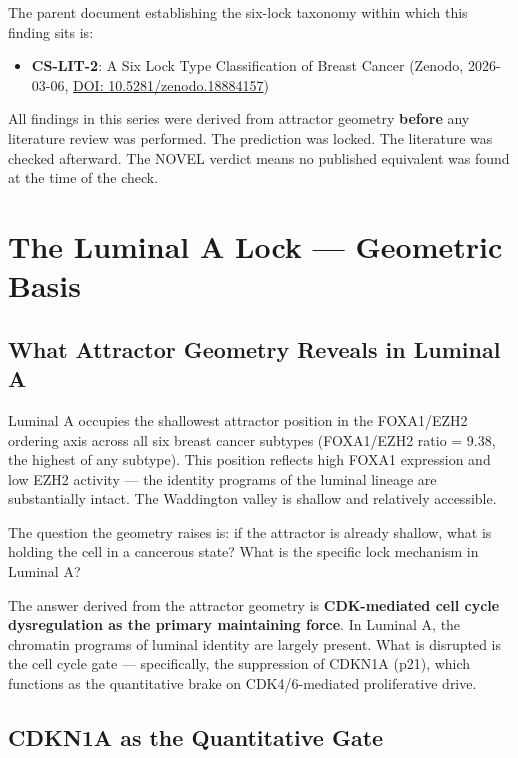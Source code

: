 \documentclass[12pt, a4paper]{article}
\begin{document}
The parent document establishing the six-lock taxonomy within
which this finding sits is:

\begin{itemize}
    \item \textbf{CS-LIT-2}: A Six Lock Type Classification
    of Breast Cancer (Zenodo, 2026-03-06,
    \href{https://doi.org/10.5281/zenodo.18884157}
    {DOI: 10.5281/zenodo.18884157})
\end{itemize}

All findings in this series were derived from attractor
geometry \textbf{before} any literature review was
performed. The prediction was locked. The literature was
checked afterward. The NOVEL verdict means no published
equivalent was found at the time of the check.

\section{The Luminal A Lock --- Geometric Basis}

\subsection{What Attractor Geometry Reveals in Luminal A}

Luminal A occupies the shallowest attractor position in the
FOXA1/EZH2 ordering axis across all six breast cancer subtypes
(FOXA1/EZH2 ratio = 9.38, the highest of any subtype).
This position reflects high FOXA1 expression and low EZH2
activity --- the identity programs of the luminal lineage are
substantially intact. The Waddington valley is shallow and
relatively accessible.

The question the geometry raises is: if the attractor is
already shallow, what is holding the cell in a cancerous
state? What is the specific lock mechanism in Luminal A?

The answer derived from the attractor geometry is
\textbf{CDK-mediated cell cycle dysregulation as the primary
maintaining force}. In Luminal A, the chromatin programs
of luminal identity are largely present. What is disrupted
is the cell cycle gate --- specifically, the suppression of
CDKN1A (p21), which functions as the quantitative brake on
CDK4/6-mediated proliferative drive.

\subsection{CDKN1A as the Quantitative Gate}
\end{document}

